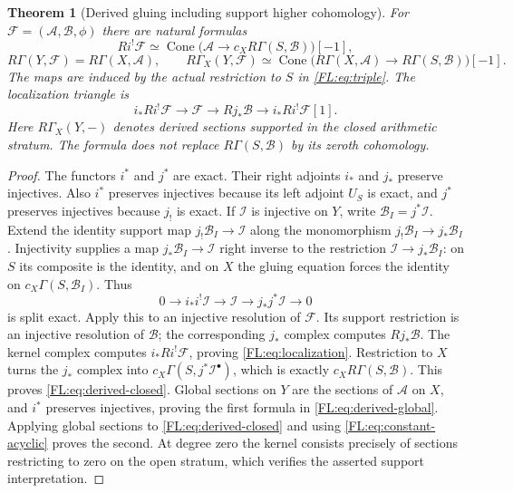 \documentclass[11pt,a4paper]{article}
\newtheorem{theorem}{Theorem}[section]
\theoremstyle{definition}\newtheorem{definition}[theorem]{Definition}
\begin{document}
\begin{theorem}[Derived gluing including support higher cohomology]
\label{FL:thm:derived-finite}
For $\mathcal F=(\mathcal A,\mathcal B,\phi)$ there are natural formulas
\[
 Ri^!\mathcal F\simeq
 \operatorname{Cone}\bigl(\mathcal A\longrightarrow
          c_XR\Gamma(S,\mathcal B)\bigr)[-1],
 \tag{FL11}\label{FL:eq:derived-closed}
\]
\[
 R\Gamma(Y,\mathcal F)=R\Gamma(X,\mathcal A),\qquad
 R\Gamma_X(Y,\mathcal F)\simeq
 \operatorname{Cone}\bigl(R\Gamma(X,\mathcal A)
                \longrightarrow R\Gamma(S,\mathcal B)\bigr)[-1].
 \tag{FL12}\label{FL:eq:derived-global}
\]
The maps are induced by the actual restriction to $S$ in
\eqref{FL:eq:triple}. The localization triangle is
\[
 i_*Ri^!\mathcal F\longrightarrow\mathcal F
 \longrightarrow Rj_*\mathcal B\longrightarrow i_*Ri^!\mathcal F[1].
 \tag{FL13}\label{FL:eq:localization}
\]
Here $R\Gamma_X(Y,-)$ denotes derived sections supported in the closed
arithmetic stratum. The formula does not replace $R\Gamma(S,\mathcal B)$
by its zeroth cohomology.
\end{theorem}
\begin{proof}
The functors $i^*$ and $j^*$ are exact. Their right adjoints $i_*$ and
$j_*$ preserve injectives. Also $i^*$ preserves injectives because
its left adjoint $U_S$ is exact, and $j^*$ preserves injectives because
$j_!$ is exact.
If $\mathcal I$ is injective on $Y$, write
$\mathcal B_I=j^*\mathcal I$. Extend the identity support map
$j_!\mathcal B_I\to\mathcal I$ along the monomorphism
$j_!\mathcal B_I\to j_*\mathcal B_I$. Injectivity supplies a map
$j_*\mathcal B_I\to\mathcal I$ right inverse to the restriction
$\mathcal I\to j_*\mathcal B_I$: on $S$ its composite is the identity,
and on $X$ the gluing equation forces the identity on
$c_X\Gamma(S,\mathcal B_I)$. Thus
\[
 0\to i_*i^!\mathcal I\to\mathcal I\to j_*j^*\mathcal I\to0
\]
is split exact. Apply this to an injective resolution of $\mathcal F$.
Its support restriction is an injective resolution of $\mathcal B$;
the corresponding $j_*$ complex computes $Rj_*\mathcal B$.
The kernel complex computes $i_*Ri^!\mathcal F$, proving
\eqref{FL:eq:localization}. Restriction to $X$ turns the $j_*$ complex
into $c_X\Gamma(S,j^*\mathcal I^\bullet)$, which is exactly
$c_XR\Gamma(S,\mathcal B)$. This proves
\eqref{FL:eq:derived-closed}. Global sections on $Y$ are the sections
of $\mathcal A$ on $X$, and $i^*$ preserves injectives, proving the
first formula in \eqref{FL:eq:derived-global}. Applying global sections
to \eqref{FL:eq:derived-closed} and using
\eqref{FL:eq:constant-acyclic} proves the second. At degree zero the
kernel consists precisely of sections restricting to zero on the
open stratum, which verifies the asserted support interpretation.
\end{proof}
\end{document}
